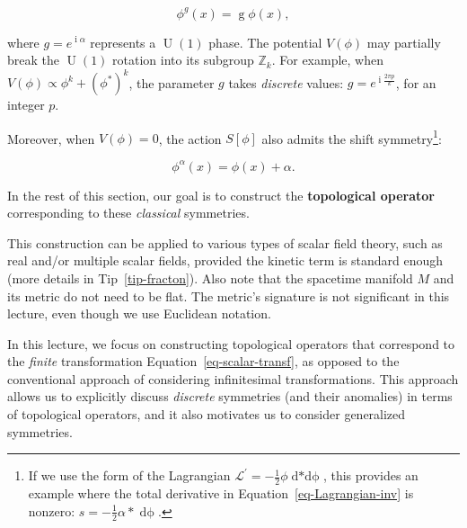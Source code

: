 \documentclass[
  letterpaper,
  DIV=11,
  numbers=noendperiod]{scrreport}
\DeclareMathOperator{\U}{U}
\DeclareMathOperator{\imunit}{i}
\begin{document}
\[
\phi^g(x) = \mathop{g} \phi(x),
\]

where \(g=e^{\imunit \alpha}\) represents a \(\U(1)\) phase. The
potential \(V(\phi)\) may partially break the \(\U(1)\) rotation into
its subgroup \(\mathbb{Z}_k\). For example, when
\(V(\phi)\propto \phi^k+(\phi^*)^k\), the parameter \(g\) takes
\emph{discrete} values: \(g = e^{\imunit \frac{2\pi p}{k}}\), for an
integer \(p\).

Moreover, when \(V(\phi)=0\), the action \(S[\phi]\) also admits the
shift symmetry\footnote{If we use the form of the Lagrangian
  \(\mathcal{L}^\prime= -\frac12 \phi \mathop{d*d\phi}\), this provides
  an example where the total derivative in
  Equation~\ref{eq-Lagrangian-inv} is nonzero:
  \(s=-\frac12 \alpha \mathop{*}\mathop{d\phi}\).}:

\[
\phi^{\alpha}(x) = \phi(x) + \alpha.
\]

In the rest of this section, our goal is to construct the
\textbf{topological operator} corresponding to these \emph{classical}
symmetries.

\begin{tcolorbox}[enhanced jigsaw, arc=.35mm, bottomrule=.15mm, toprule=.15mm, title=\textcolor{quarto-callout-note-color}{\faInfo}\hspace{0.5em}{Note}, colback=white, opacitybacktitle=0.6, rightrule=.15mm, opacityback=0, breakable, bottomtitle=1mm, titlerule=0mm, leftrule=.75mm, coltitle=black, colframe=quarto-callout-note-color-frame, toptitle=1mm, left=2mm, colbacktitle=quarto-callout-note-color!10!white]

This construction can be applied to various types of scalar field
theory, such as real and/or multiple scalar fields, provided the kinetic
term is standard enough (more details in Tip~\ref{tip-fracton}). Also
note that the spacetime manifold \(M\) and its metric do not need to be
flat. The metric's signature is not significant in this lecture, even
though we use Euclidean notation.

\end{tcolorbox}

\begin{tcolorbox}[enhanced jigsaw, arc=.35mm, bottomrule=.15mm, toprule=.15mm, title=\textcolor{quarto-callout-note-color}{\faInfo}\hspace{0.5em}{Note}, colback=white, opacitybacktitle=0.6, rightrule=.15mm, opacityback=0, breakable, bottomtitle=1mm, titlerule=0mm, leftrule=.75mm, coltitle=black, colframe=quarto-callout-note-color-frame, toptitle=1mm, left=2mm, colbacktitle=quarto-callout-note-color!10!white]

In this lecture, we focus on constructing topological operators that
correspond to the \emph{finite} transformation
Equation~\ref{eq-scalar-transf}, as opposed to the conventional approach
of considering infinitesimal transformations. This approach allows us to
explicitly discuss \emph{discrete} symmetries (and their anomalies) in
terms of topological operators, and it also motivates us to consider
generalized symmetries.

\end{tcolorbox}
\end{document}
